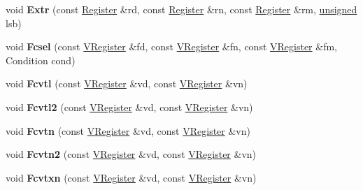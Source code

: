 \begin{DoxyCompactItemize}
void {\bfseries Extr} (const \mbox{\hyperlink{classv8_1_1internal_1_1Register}{Register}} \&rd, const \mbox{\hyperlink{classv8_1_1internal_1_1Register}{Register}} \&rn, const \mbox{\hyperlink{classv8_1_1internal_1_1Register}{Register}} \&rm, \mbox{\hyperlink{classunsigned}{unsigned}} lsb)
\item 
\mbox{\label{classv8_1_1internal_1_1MacroAssembler_ad0bf2750e632c146f02bf04aa2268f9b}} 
void {\bfseries Fcsel} (const \mbox{\hyperlink{classv8_1_1internal_1_1VRegister}{V\+Register}} \&fd, const \mbox{\hyperlink{classv8_1_1internal_1_1VRegister}{V\+Register}} \&fn, const \mbox{\hyperlink{classv8_1_1internal_1_1VRegister}{V\+Register}} \&fm, Condition cond)
\item 
\mbox{\label{classv8_1_1internal_1_1MacroAssembler_a1a7bf7277fca94cee406b82d1fdab8e0}} 
void {\bfseries Fcvtl} (const \mbox{\hyperlink{classv8_1_1internal_1_1VRegister}{V\+Register}} \&vd, const \mbox{\hyperlink{classv8_1_1internal_1_1VRegister}{V\+Register}} \&vn)
\item 
\mbox{\label{classv8_1_1internal_1_1MacroAssembler_afcb2944eed2bc88d2f91c6fec6fa9e2d}} 
void {\bfseries Fcvtl2} (const \mbox{\hyperlink{classv8_1_1internal_1_1VRegister}{V\+Register}} \&vd, const \mbox{\hyperlink{classv8_1_1internal_1_1VRegister}{V\+Register}} \&vn)
\item 
\mbox{\label{classv8_1_1internal_1_1MacroAssembler_a9ce03d0321080ff50242db505f804986}} 
void {\bfseries Fcvtn} (const \mbox{\hyperlink{classv8_1_1internal_1_1VRegister}{V\+Register}} \&vd, const \mbox{\hyperlink{classv8_1_1internal_1_1VRegister}{V\+Register}} \&vn)
\item 
\mbox{\label{classv8_1_1internal_1_1MacroAssembler_a8937555352c3f1a11b29cac1d7558f16}} 
void {\bfseries Fcvtn2} (const \mbox{\hyperlink{classv8_1_1internal_1_1VRegister}{V\+Register}} \&vd, const \mbox{\hyperlink{classv8_1_1internal_1_1VRegister}{V\+Register}} \&vn)
\item 
\mbox{\label{classv8_1_1internal_1_1MacroAssembler_ab358b3547e5f58933752e0f0338d96a4}} 
void {\bfseries Fcvtxn} (const \mbox{\hyperlink{classv8_1_1internal_1_1VRegister}{V\+Register}} \&vd, const \mbox{\hyperlink{classv8_1_1internal_1_1VRegister}{V\+Register}} \&vn)

\end{DoxyCompactItemize}
